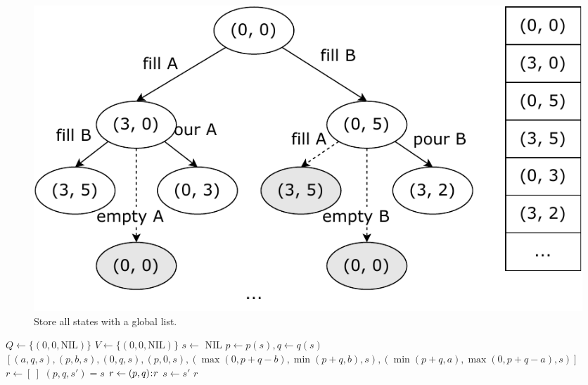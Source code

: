 \documentclass[b5paper]{article}
\begin{document}
\begin{figure}[htbp]
  \centering
  \includegraphics[scale=0.5]{img/water-jugs}
  \caption{Store all states with a global list.}
  \label{fig:water-jugs}
\end{figure}

\begin{algorithmic}[1]
  \State $Q \gets \{(0, 0, \text{NIL})\}$  
  \State $V \gets \{(0, 0, \text{NIL})\}$  
    \State $s \gets$ 
      \State \Return {}
    \Else
          \State {}
          \State {}
        \EndIf
      \EndFor
    \EndIf
  \EndWhile
  \State \Return NIL
\EndFunction
\Statex
{}
  \State $p \gets p(s), q \gets q(s)$
  \State \Return $[(a, q, s), (p, b, s), (0, q, s), (p, 0, s), (\max(0, p + q - b), \min(p + q, b), s), (\min(p + q, a), \max(0, p + q - a), s)]$
\EndFunction
\Statex
{}
  \State $r \gets [\ ]$
    \State $(p, q, s') = s$
    \State $r \gets (p, q) \mathbin{\!:\!} r$
    \State $s \gets s'$
  \EndWhile
  \State \Return $r$
\EndFunction
\end{algorithmic}

\begin{Exercise}[label={ex:water-jugs-puzzle}]
\end{Exercise}
\end{document}
